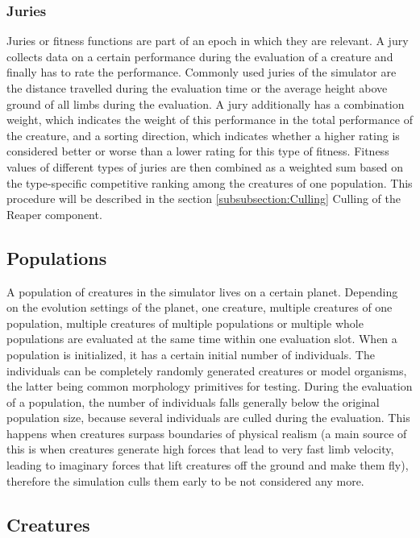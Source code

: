 \documentclass[main]{subfiles}
\begin{document}
\subsubsection{Juries}

Juries or fitness functions are part of an epoch in which they are relevant. A jury collects data on a certain performance during the evaluation of a creature and finally has to rate the performance. Commonly used juries of the simulator are the distance travelled during the evaluation time or the average height above ground of all limbs during the evaluation. A jury additionally has a combination weight, which indicates the weight of this performance in the total performance of the creature, and a sorting direction, which indicates whether a higher rating is considered better or worse than a lower rating for this type of fitness. Fitness values of different types of juries are then combined as a weighted sum based on the type-specific competitive ranking among the creatures of one population. This procedure will be described in the section \ref{subsubsection:Culling} Culling of the Reaper component.

\subsection{Populations}
\label{subsec:populations}

A population of creatures in the simulator lives on a certain planet. Depending on the evolution settings of the planet, one creature, multiple creatures of one population, multiple creatures of multiple populations or multiple whole populations are evaluated at the same time within one evaluation slot. When a population is initialized, it has a certain initial number of individuals. The individuals can be completely randomly generated creatures or model organisms, the latter being common morphology primitives for testing. During the evaluation of a population, the number of individuals falls generally below the original population size, because several individuals are culled during the evaluation. This happens when creatures surpass boundaries of physical realism (a main source of this is when creatures generate high forces that lead to very fast limb velocity, leading to imaginary forces that lift creatures off the ground and make them fly), therefore the simulation culls them early to be not considered any more.

\subsection{Creatures}
\end{document}
